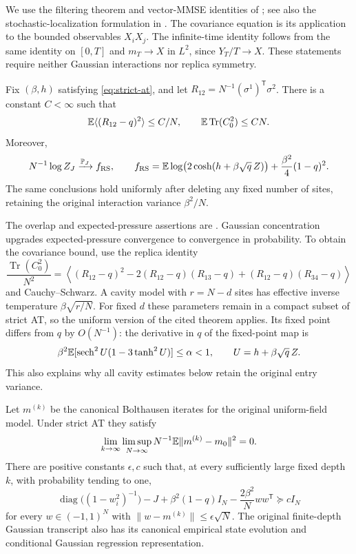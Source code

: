 \documentclass[11pt,reqno]{amsart}
\newcommand{\Tr}{\operatorname{Tr}}
\newcommand{\sech}{\operatorname{sech}}
\begin{document}
We use the filtering theorem and vector-MMSE identities of \cite[Theorem~2 and Eq.~(2.25)]{elalaoui2022information}; see also the stochastic-localization formulation in \cite{montanari2023posterior}. The covariance equation is its application to the bounded observables $X_iX_j$. The infinite-time identity follows from the same identity on $[0,T]$ and $m_T\to X$ in $L^2$, since $Y_T/T\to X$. These statements require neither Gaussian interactions nor replica symmetry.

\begin{lem}\label{lem:original-overlap}
Fix $(\beta,h)$ satisfying \eqref{eq:strict-at}, and let $R_{12}=N^{-1}(\sigma^1)^{\mathsf T}\sigma^2$. There is a constant $C<\infty$ such that
\[
 \bbE\langle(R_{12}-q)^2\rangle\le C/N,
 \qquad \bbE\Tr(C_0^2)\le CN.
\]
Moreover,
\[
 N^{-1}\log Z_J\xrightarrow{{\mathbb{P}}_J}f_{\mathrm{RS}},\qquad
 f_{\mathrm{RS}}={\mathbb{E}}\log\bigl(2\cosh(h+\beta\sqrt q\,Z)\bigr)
                     +\frac{\beta^2}{4}(1-q)^2.
\]
The same conclusions hold uniformly after deleting any fixed number of sites, retaining the original interaction variance $\beta^2/N$.
\end{lem}

The overlap and expected-pressure assertions are \cite[Theorem~1.1]{kusuoka2026quantitative}. Gaussian concentration \cite[Section~5.4]{boucheron2013concentration} upgrades expected-pressure convergence to convergence in probability. To obtain the covariance bound, use the replica identity
\[
 \frac{\Tr(C_0^2)}{N^2}
 =\left\langle (R_{12}-q)^2
       -2(R_{12}-q)(R_{13}-q)
       +(R_{12}-q)(R_{34}-q)\right\rangle
\]
and Cauchy--Schwarz. A cavity model with $r=N-d$ sites has effective inverse temperature $\beta\sqrt{r/N}$. For fixed $d$ these parameters remain in a compact subset of strict AT, so the uniform version of the cited theorem applies. Its fixed point differs from $q$ by $O(N^{-1})$: the derivative in $q$ of the fixed-point map is
\[
 \beta^2\bbE[\sech^2U(1-3\tanh^2U)]\le\alpha<1,
 \qquad U=h+\beta\sqrt q\,Z.
\]
This also explains why all cavity estimates below retain the original entry variance.

\begin{lem}\label{lem:original-tap-input}
Let $m^{(k)}$ be the canonical Bolthausen iterates for the original uniform-field model. Under strict AT they satisfy
\[
 \lim_{k\to\infty}\limsup_{N\to\infty}
       N^{-1}{\mathbb{E}}\|m^{(k)}-m_0\|^2=0.
\]
There are positive constants $\epsilon,c$ such that, at every sufficiently large fixed depth $k$, with probability tending to one,
\[
 \operatorname{diag}\bigl((1-w_i^2)^{-1}\bigr)-J
       +\beta^2(1-q)I_N-\frac{2\beta^2}{N}ww^{\mathsf T}
       \succeq cI_N
\]
for every $w\in(-1,1)^N$ with $\|w-m^{(k)}\|\le\epsilon\sqrt N$. The original finite-depth Gaussian transcript also has its canonical empirical state evolution and conditional Gaussian regression representation.
\end{lem}
\end{document}
